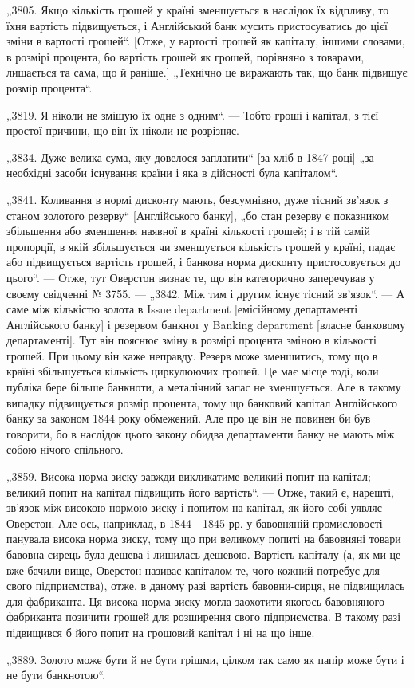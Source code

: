 „3805. Якщо кількість грошей у країні зменшується в наслідок
їх відпливу, то їхня вартість підвищується, і Англійський банк
мусить пристосуватись до цієї зміни в вартості грошей“. [Отже, у вартості грошей як капіталу, іншими
словами, в розмірі процента, бо вартість грошей як грошей, порівняно з товарами,
лишається та сама, що й раніше.] „Технічно це виражають так,
що банк підвищує розмір процента“.

„3819. Я ніколи не змішую їх одне з одним“. — Тобто гроші
і капітал, з тієї простої причини, що він їх ніколи не розрізняє.

„3834. Дуже велика сума, яку довелося заплатити“ [за хліб
в 1847 році] „за необхідні засоби існування країни і яка в дійсності була капіталом“.

„3841. Коливання в нормі дисконту мають, безсумнівно, дуже
тісний зв’язок з станом золотого резерву“ [Англійського
банку], „бо стан резерву є показником збільшення або зменшення
наявної в країні кількості грошей; і в тій самій пропорції, в якій
збільшується чи зменшується кількість грошей у країні, падає або
підвищується вартість грошей, і банкова норма дисконту пристосовується до цього“. — Отже, тут
Оверстон визнає те, що він
категорично заперечував у своєму свідченні № 3755. — „3842. Між
тим і другим існує тісний зв’язок“. — А саме між кількістю золота
в Issue department [емісійному департаменті Англійського банку]
і резервом банкнот у Banking department [власне банковому департаменті]. Тут він пояснює зміну в
розмірі процента зміною в кількості грошей. При цьому він каже неправду. Резерв може зменшитись,
тому що в країні збільшується кількість циркулюючих грошей.
Це має місце тоді, коли публіка бере більше банкноти, а металічний запас не зменшується. Але в
такому випадку підвищується
розмір процента, тому що банковий капітал Англійського банку
за законом 1844 року обмежений. Але про це він не повинен
би був говорити, бо в наслідок цього закону обидва департаменти банку не мають між собою нічого
спільного.

„3859. Висока норма зиску завжди викликатиме великий попит
на капітал; великий попит на капітал підвищить його вартість“. — Отже, такий є, нарешті, зв’язок між
високою нормою
зиску і попитом на капітал, як його собі уявляє Оверстон. Але
ось, наприклад, в 1844—1845 рр. у бавовняній промисловості
панувала висока норма зиску, тому що при великому попиті на
бавовняні товари бавовна-сирець була дешева і лишилась дешевою. Вартість капіталу (а, як ми це вже
бачили вище, Оверстон називає капіталом те, чого кожний потребує для свого
підприємства), отже, в даному разі вартість бавовни-сирця, не
підвищилась для фабриканта. Ця висока норма зиску могла
заохотити якогось бавовняного фабриканта позичити грошей для
розширення свого підприємства. В такому разі підвищився б його
попит на грошовий капітал і ні на що інше.

„3889. Золото може бути й не бути грішми, цілком так само
як папір може бути і не бути банкнотою“.
